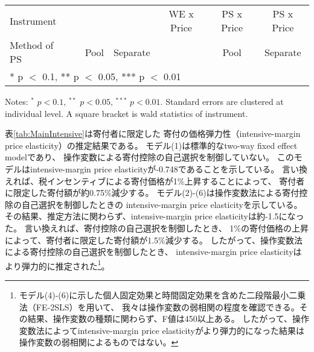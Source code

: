 \documentclass[
  11pt,
  a4paper,
]{article}
\begin{document}
\begin{table}
\begin{threeparttable}
\begin{tabular}[t]{lcccccc}
Instrument &  &  &  & WE x Price & PS x Price & PS x Price\\
Method of PS &  & Pool & Separate &  & Pool & Separate\\
\bottomrule
\multicolumn{7}{l}{\rule{0pt}{1em}* p $<$ 0.1, ** p $<$ 0.05, *** p $<$ 0.01}\\
\end{tabular}
\begin{tablenotes}
\item Notes: $^{*}$ $p < 0.1$, $^{**}$ $p < 0.05$, $^{***}$ $p < 0.01$. Standard errors are clustered at individual level. A square bracket is wald statistics of instrument.
\end{tablenotes}
\end{threeparttable}
\end{table}

表\ref{tab:MainIntensive}は寄付者に限定した
寄付の価格弾力性（intensive-margin price elasticity）の推定結果である。
モデル(1)は標準的なtwo-way fixed effect modelであり、
操作変数による寄付控除の自己選択を制御していない。
このモデルはintensive-margin price elasticityが-0.748であることを示している。
言い換えれば、税インセンティブによる寄付価格が1\%上昇することによって、
寄付者に限定した寄付額が約0.75\%減少する。
モデル(2)-(6)は操作変数法による寄付控除の自己選択を制御したときの
intensive-margin price elasticityを示している。
その結果、推定方法に関わらず、intensive-margin price elasticityは約-1.5になった。
言い換えれば、寄付控除の自己選択を制御したとき、
1\%の寄付価格の上昇によって、寄付者に限定した寄付額が1.5\%減少する。
したがって、操作変数法による寄付控除の自己選択を制御したとき、
intensive-margin price elasticityはより弾力的に推定された\footnote{モデル(4)-(6)に示した個人固定効果と時間固定効果を含めた二段階最小二乗法（FE-2SLS）を用いて、
  我々は操作変数の弱相関の程度を確認できる。その結果、操作変数の種類に関わらず、F値は450以上ある。
  したがって、操作変数法によってintensive-margin price elasticityがより弾力的になった結果は
  操作変数の弱相関によるものではない。}。
\end{document}
